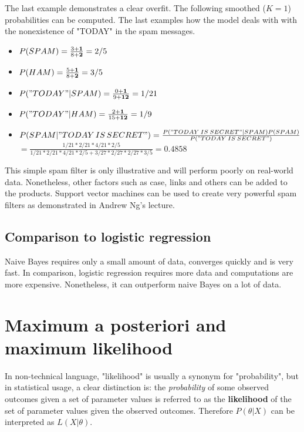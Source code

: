 \documentclass{report}
\begin{document}
The last example demonstrates a clear overfit. The following smoothed ($K=1$) probabilities can be computed. The last examples how the model deals with with the nonexistence of "TODAY" in the spam messages.
\begin{itemize}
\item $P(SPAM) = \frac{3+{\bf 1}}{8+{\bf 2}} = 2/5$
\item $P(HAM) = \frac{5+{\bf 1}}{8+{\bf 2}} = 3/5$
\item $P("TODAY"\vert SPAM) = \frac{0+{\bf 1}}{9+{\bf 12}} = 1/21$
\item $P("TODAY"\vert HAM) = \frac{2+{\bf 1}}{15+{\bf 12}} = 1/9$
\item $P(SPAM\vert "TODAY\,IS\,SECRET")= \frac{P("TODAY\:IS\:SECRET"\vert SPAM)P(SPAM)}{P("TODAY\:IS\:SECRET")}$\\
$=\frac{1/21*2/21*4/21*2/5}{1/21*2/21*4/21*2/5+3/27*2/27*2/27*3/5}=0.4858$
\end{itemize}

This simple spam filter is only illustrative and will perform poorly on real-world data. Nonetheless, other factors such as case, links and others can be added to the products. Support vector machines can be used to create very powerful spam filters as demonstrated in Andrew Ng's lecture.


\subsection{Comparison to logistic regression}
Naive Bayes requires only a small amount of data, converges quickly and is very fast. In comparison, logistic regression requires more data and computations are more expensive. Nonetheless, it can outperform naive Bayes on a lot of data.


\section{Maximum a posteriori and maximum likelihood}
\label{ref:estimationsection}
In non-technical language, "likelihood" is usually a synonym for "probability", but in statistical usage, a clear distinction is: the {\em probability} of some observed outcomes given a set of parameter values is referred to as the {\bf likelihood} of the set of parameter values given the observed outcomes. Therefore $P(\theta\vert X)$ can be interpreted as $L(X\vert\theta)$.
\end{document}
